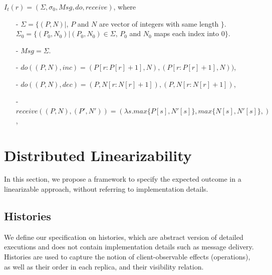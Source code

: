 \begin{example}
\label{definition:state-based PN-counter}
$I_t(r) = (\Sigma, \sigma_0, \mathit{Msg}, \mathit{do},\mathit{receive})$, where

\begin{itemize}
\setlength{\itemsep}{0.5pt}
\item[-] $\Sigma = \{ (P,N) \vert$, $P$ and $N$ are vector of integers with same length $\}$. $\Sigma_0 = \{ (P_0,N_0) \vert (P_0,N_0) \in \Sigma$, $P_0$ and $N_0$ maps each index into $0 \}$.

\item[-] $\mathit{Msg} = \Sigma$.

\item[-] $\mathit{do}((P,N),\mathit{inc}) = (P[r:P[r]+1],N),(P[r:P[r]+1],N))$,

\item[-] $\mathit{do}((P,N),\mathit{dec}) = (P,N[r:N[r]+1]),(P,N[r:N[r]+1])$,

\item[-] $\mathit{receive}((P,N),(P',N')) = (\lambda s. \mathit{max}\{  P[s], N'[s] \}, \mathit{max}\{  N[s], N'[s] \},)$,
\end{itemize}
\end{example}





















\section{Distributed Linearizability}
\label{sec:distributed-lin}

In this section, we propose a framework to specify the expected outcome in a linearizable approach, without referring to implementation details.



\subsection{Histories}
\label{subsec:histories} 

We define our specification on histories, which are abstract version of detailed executions and does not contain implementation details such as message delivery. Histories are used to capture the notion of client-observable effects (operations), as well as their order in each replica, and their visibility relation. 

